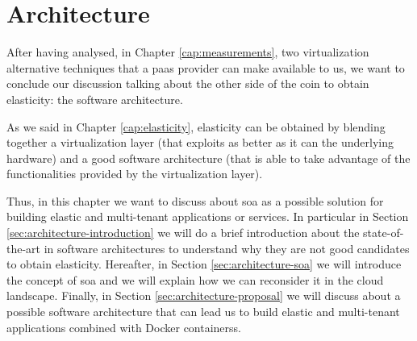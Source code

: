 %
%
\chapter{Architecture}
\label{cap:architecture}
After having analysed, in Chapter \ref{cap:measurements}, two virtualization alternative techniques that
a \ac{paas} provider can make available to us, we want to conclude our discussion talking about the other
side of the coin to obtain elasticity: the software architecture.

As we said in Chapter \ref{cap:elasticity}, elasticity can be obtained by blending together a virtualization
layer (that exploits as better as it can the underlying hardware) and a good software architecture (that is
able to take advantage of the functionalities provided by the virtualization layer).

Thus, in this chapter we want to discuss about \acf{soa} as a possible solution for building elastic and
multi-tenant applications or services. In particular in Section \ref{sec:architecture-introduction} we will
do a brief introduction about the state-of-the-art in software architectures to understand why they are not
good candidates to obtain elasticity. Hereafter, in Section \ref{sec:architecture-soa} we will introduce
the concept of \ac{soa} and we will explain how we can reconsider it in the cloud landscape. Finally, in
Section \ref{sec:architecture-proposal} we will discuss about a possible software architecture that can lead 
us to build elastic and multi-tenant applications combined with Docker containerss.





